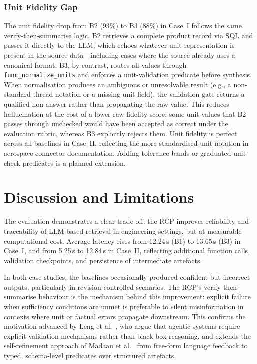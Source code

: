 \documentclass[largeformat]{interact}
\begin{document}
\subsubsection{Unit Fidelity Gap}
\label{subsubsection:unit_fidelity_gap}
The unit fidelity drop from B2 (93\%) to B3 (88\%) in Case~I follows the same verify-then-summarise logic. B2 retrieves a complete product record via SQL and passes it directly to the LLM, which echoes whatever unit representation is present in the source data---including cases where the source already uses a canonical format. B3, by contrast, routes all values through \texttt{func\_normalize\_units} and enforces a unit-validation predicate before synthesis. When normalisation produces an ambiguous or unresolvable result (e.g., a non-standard thread notation or a missing unit field), the validation gate returns a qualified non-answer rather than propagating the raw value. This reduces hallucination at the cost of a lower raw fidelity score: some unit values that B2 passes through unchecked would have been accepted as correct under the evaluation rubric, whereas B3 explicitly rejects them. Unit fidelity is perfect across all baselines in Case~II, reflecting the more standardised unit notation in aerospace connector documentation. Adding tolerance bands or graduated unit-check predicates is a planned extension.


\section{Discussion and Limitations}
\label{sec:Discussion}
The evaluation demonstrates a clear trade-off: the RCP improves reliability and traceability of LLM-based retrieval in engineering settings, but at measurable computational cost. Average latency rises from 12.24\,s (B1) to 13.65\,s (B3) in Case~I, and from 5.25\,s to 12.84\,s in Case~II, reflecting additional function calls, validation checkpoints, and persistence of intermediate artefacts.

In both case studies, the baselines occasionally produced confident but incorrect outputs, particularly in revision-controlled scenarios. The RCP's verify-then-summarise behaviour is the mechanism behind this improvement: explicit failure when sufficiency conditions are unmet is preferable to silent misinformation in contexts where unit or factual errors propagate downstream. This confirms the motivation advanced by Leng et al.~\cite{leng2026}, who argue that agentic systems require explicit validation mechanisms rather than black-box reasoning, and extends the self-refinement approach of Madaan et al.~\cite{madaan2023selfrefine} from free-form language feedback to typed, schema-level predicates over structured artefacts.
\end{document}

